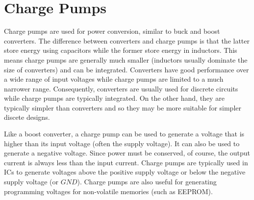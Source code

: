 \chapter{Charge Pumps}
Charge pumps are used for power conversion, similar to buck and boost converters. The difference between converters and charge pumps is that the latter store energy using capacitors while the former store energy in inductors. This means charge pumps are generally much smaller (inductors usually dominate the size of converters) and can be integrated. Converters have good performance over a wide range of input voltages while charge pumps are limited to a much narrower range. Consequently, converters are usually used for discrete circuits while charge pumps are typically integrated. On the other hand, they are typically simpler than converters and so they may be more suitable for simpler discete designs.
\par
Like a boost converter, a charge pump can be used to generate a voltage that is higher than its input voltage (often the supply voltage). It can also be used to generate a negative voltage. Since power must be conserved, of course, the output current is always less than the input current. Charge pumps are typically used in ICs to generate voltages above the positive supply voltage or below the negative supply voltage (or $GND$). Charge pumps are also useful for generating programming voltages for non-volatile memories (such as EEPROM).





